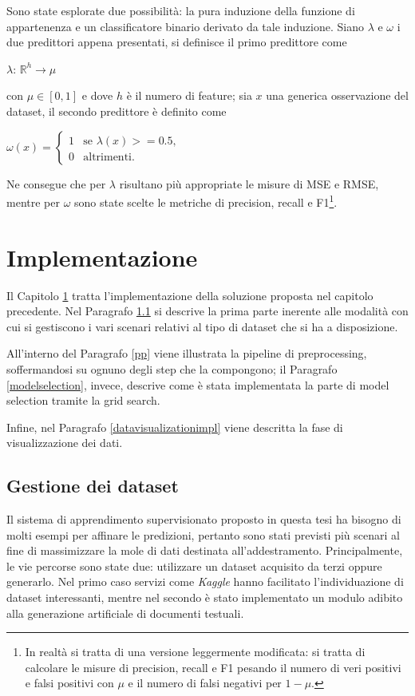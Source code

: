 \documentclass[12pt]{report}
\theoremstyle{definition}
\begin{document}
Sono state esplorate due possibilità: la pura induzione della funzione di appartenenza e un classificatore binario derivato da tale induzione.
Siano $\lambda$ e $\omega$ i due predittori appena presentati, si definisce il primo predittore come
\begin{center}
    $\lambda$: $\mathbb{R}^h \rightarrow \mu$
\end{center}
con $\mu \in [0,1]$ e dove $h$ è il numero di feature; sia $x$ una generica osservazione del dataset, il secondo predittore è definito come
\begin{center}
    $\omega(x) = \begin{cases} 1 & \mbox{se } \lambda(x) >= 0.5, \\ 0 & \mbox{altrimenti.} \end{cases}$
\end{center}
Ne consegue che per $\lambda$ risultano più appropriate le misure di MSE e RMSE, mentre per $\omega$ sono state scelte le metriche di precision, recall e F1\footnote{In realtà si tratta di una versione leggermente modificata: si tratta di calcolare le misure di precision, recall e F1 pesando il numero di veri positivi e falsi positivi con $\mu$ e il numero di falsi negativi per $1-\mu$.}.

\chapter{Implementazione}
\label{Capitolo 3}
\onehalfspacing
Il Capitolo \ref{Capitolo 3} tratta l'implementazione della soluzione proposta nel capitolo precedente. Nel Paragrafo \ref{datasethandle} si descrive la prima parte inerente alle modalità con cui si gestiscono i vari scenari relativi al tipo di dataset che si ha a disposizione.

All'interno del Paragrafo \ref{pp} viene illustrata la pipeline di preprocessing, soffermandosi su ognuno degli step che la compongono; il Paragrafo \ref{modelselection}, invece, descrive come è stata implementata la parte di model selection tramite la grid search.

Infine, nel Paragrafo \ref{datavisualizationimpl} viene descritta la fase di visualizzazione dei dati.

\section{Gestione dei dataset}\label{datasethandle}
Il sistema di apprendimento supervisionato proposto in questa tesi ha bisogno di molti esempi per affinare le predizioni, pertanto sono stati previsti più scenari al fine di massimizzare la mole di dati destinata all'addestramento. Principalmente, le vie percorse sono state due: utilizzare un dataset acquisito da terzi oppure generarlo.
Nel primo caso servizi come \textit{Kaggle} hanno facilitato l'individuazione di dataset interessanti, mentre nel secondo è stato implementato un modulo adibito alla generazione artificiale di documenti testuali.
\end{document}
